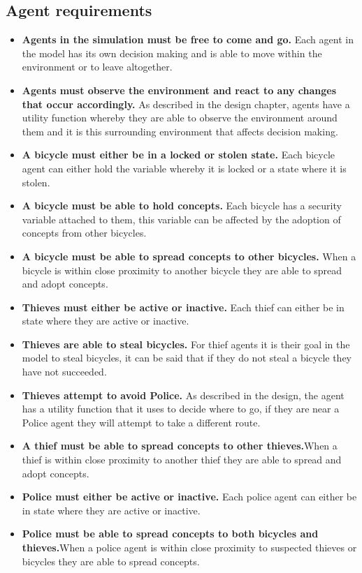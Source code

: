 \documentclass[11pt]{informatics-report}
\begin{document}
\subsection{Agent requirements}
\begin{itemize}
\item \textbf{Agents in the simulation must be free to come and go.} Each agent in the model has its own decision making and is able to move within the environment or to leave altogether.
\item \textbf{Agents must observe the environment and react to any changes that occur accordingly.} As described in the design chapter, agents have a utility function whereby they are able to observe the environment around them and it is this surrounding environment that affects decision making.
\item \textbf{A bicycle must either be in a locked or stolen state.} Each bicycle agent can either hold the variable whereby it is locked or a state where it is stolen.
\item \textbf{A bicycle must be able to hold concepts.} Each bicycle has a security variable attached to them, this variable can be affected by the adoption of concepts from other bicycles.
\item \textbf{A bicycle must be able to spread concepts to other bicycles.} When a bicycle is within close proximity to another bicycle they are able to spread and adopt concepts.
\item \textbf{Thieves must either be active or inactive.} Each thief can either be in state where they are active or inactive.
\item \textbf{Thieves are able to steal bicycles.} For thief agents it is their goal in the model to steal bicycles, it can be said that if they do not steal a bicycle they have not succeeded.
\item \textbf{Thieves attempt to avoid Police.} As described in the design, the agent has a utility function that it uses to decide where to go, if they are near a Police agent they will attempt to take a different route.
\item \textbf{A thief must be able to spread concepts to other thieves.}When a thief is within close proximity to another thief they are able to spread and adopt concepts.
\item \textbf{Police must either be active or inactive.} Each police agent can either be in state where they are active or inactive.
\item \textbf{Police must be able to spread concepts to both bicycles and thieves.}When a police agent is within close proximity to suspected thieves or bicycles they are able to spread concepts.
\end{itemize}
\end{document}
